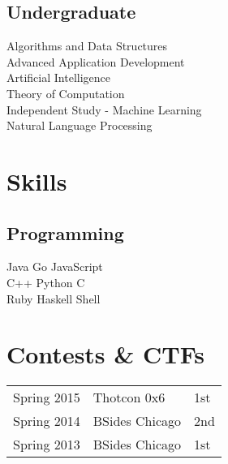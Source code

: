\documentclass[letterpaper]{deedy-resume} %
\begin{document}
\begin{minipage}[t]{0.33\textwidth}
\subsection{Undergraduate}

Algorithms and Data Structures \\
Advanced Application Development \\
Artificial Intelligence \\
Theory of Computation \\
Independent Study - Machine Learning \\
Natural Language Processing \\

\sectionspace %


\section{Skills}

\subsection{Programming}

Java \textbullet{} Go \textbullet{} JavaScript  \\
 C++ \textbullet{} Python \textbullet{} C \ \\ 
\sectionspace %
Ruby \textbullet{} Haskell \textbullet{} Shell  \\

\sectionspace %



\section{Contests \& CTF\lowercase{s}} 

\begin{tabular}{rll}
Spring 2015 & Thotcon 0x6 & 1st\\
Spring 2014 & BSides Chicago & 2nd\\
Spring 2013 & BSides Chicago & 1st\\
\end{tabular}

\sectionspace %


\end{minipage} %
\end{document}

